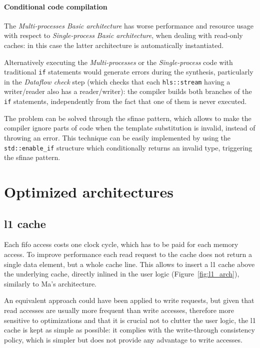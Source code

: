 \documentclass[11pt,a4paper,oneside]{memoir}
\begin{document}
\subsubsection{Conditional code compilation}
The \emph{Multi-processes Basic architecture} has worse performance and
resource usage with respect to \emph{Single-process Basic architecture}, when
dealing with read-only caches: in this case the latter architecture is
automatically instantiated.

Alternatively executing the \emph{Multi-processes} or the \emph{Single-process}
code with traditional \texttt{if} statements would generate errors during the
synthesis, particularly in the \emph{Dataflow check} step (which checks that
each \texttt{hls::stream} having a writer/reader also has a reader/writer):
the compiler builds both branches of the \texttt{if} statements, independently
from the fact that one of them is never executed.

The problem can be solved through the \ac{sfinae} pattern, which allows to make
the compiler ignore parts of code when the template substitution is invalid,
instead of throwing an error.
This technique can be easily implemented by using the \texttt{std::enable\_if}
structure which conditionally returns an invalid type, triggering the
\ac{sfinae} pattern.

\chapter{Optimized architectures}
\section{\ac{l1} cache}
Each \ac{fifo} access costs one clock cycle, which has to be paid for each
memory access.
To improve performance each read request to the cache does not return a single
data element, but a whole cache line. This allows to insert a \ac{l1} cache
above the underlying cache, directly inlined in the user logic
(Figure~\ref{fig:l1_arch}), similarly to Ma's architecture.

An equivalent approach could have been applied to write requests, but given that
read accesses are usually more frequent than write accesses, therefore more
sensitive to optimizations and that it is crucial not to clutter the user
logic, the \ac{l1} cache is kept as simple as possible: it complies with the
write-through consistency policy, which is simpler but does not provide any
advantage to write accesses.
\end{document}
